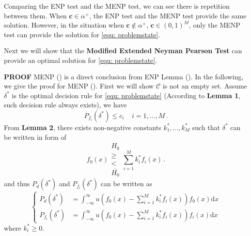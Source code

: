 Comparing the ENP test and the MENP test, we can see there is repetition between them. When $\mathbf{c} \in   \alpha^+$, the ENP test and the MENP test provide the same solution. However, in the situation when $\mathbf{c} \notin \alpha^+$, $\mathbf{c} \in (0, 1)^M$, only the MENP test can provide the solution for \eqref{equ: problemstate}. 

Next we will show that the \textbf{Modified Extended Neyman Pearson Test} can provide an optimal solution for \eqref{equ: problemstate}.

\textbf{PROOF}
MENP () is a direct conclusion from ENP Lemma (). In the following,  we give the proof for MENP (). First we will show $\mathcal{C}$ is not an empty set. 
Assume $\delta^\ast$ is the optimal decision rule for \eqref{equ: problemstate} (According to \textbf{Lemma 1}, such decision rule always exists), we have  
\begin{equation}
\label{condition 1}
P_{f_i}(\delta^\ast) \leq c_i\;\;\;\;i=1,  ..., M\,.
\end{equation}
From \textbf{Lemma 2}, there exists non-negative constants $k_1^\ast, ..., k_M^\ast$ such that $\delta^\ast$ can be written in form of 
\begin{equation}
f_0(x) \substack{H_0 \\ \geq \\ < \\ \bar{H_0}} \sum_{i=1}^{M}k_i^\ast f_i(x)\,.
\label{2015feb20a1}
\end{equation}
and thus $P_d(\delta^\ast)$ and $P_{f_i}(\delta^\ast)$ can be written as
\begin{equation}
\begin{cases}
\label{TEMP10}
P_{d}(\delta^\ast) &= \int_{-\infty}^{\infty} u(f_0(x) - \sum_{i=1}^{M}k_i^\ast f_i(x)) f_0(x) \mathrm{d}x\\
P_{f_i}(\delta^\ast) &= \int_{-\infty}^{\infty} u(f_0(x) - \sum_{i=1}^{M}k_i^\ast f_i(x)) f_i(x) \mathrm{d}x
\end{cases}
\end{equation}
where $k_i^\ast \geq 0$.

